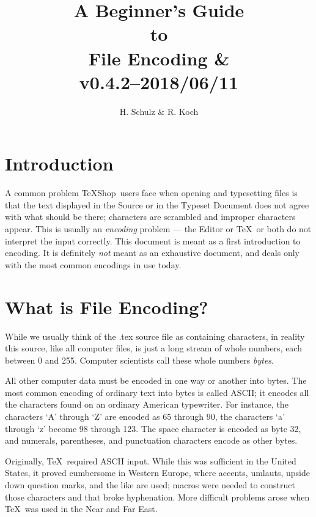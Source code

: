 \documentclass[letterpaper,11pt]{article}
\title{A Beginner's Guide\\to\\File Encoding \& \TS\\\small v0.4.2--2018/06/11}
\author{H. Schulz \& R. Koch}
\date{}
\newcommand{\TS}{\textsf{\TeX Shop}}
\newcommand{\acr}[1]{\textsf{#1}}
\newcommand{\cmd}[1]{\textsf{#1}}
\begin{document}
\maketitle


\section{Introduction}
A common problem \TS\ users face when opening and typesetting files is that the text displayed in the Source or in the Typeset Document does not agree with what should be there; characters are scrambled and  improper characters appear. This is usually an \emph{encoding} problem ---  the Editor or \TeX\ or both do not interpret the input correctly. This document is meant as a first introduction to encoding. It is definitely \emph{not} meant as an exhaustive document, and deals only with the most common encodings in use today.

\section{What is File Encoding?}
While we usually think of the \cmd{.tex} source file as containing characters, in reality this source, like all computer files, is just a long stream of whole numbers, each between 0 and 255. 
Computer scientists call these whole numbers {\em bytes}. 

All other computer data must be encoded in one way or another into bytes. The most common encoding of ordinary text into bytes is called \acr{ASCII}; it encodes all the characters found on an ordinary American typewriter. For instance, the characters `A' through `Z' are encoded as 65 through 90,  the characters `a' through `z' become 98 through 123. The space character is encoded as byte 32, and numerals, parentheses, and punctuation characters encode as other bytes.

Originally, \TeX\ required \acr{ASCII} input. While this was sufficient in the United States, it proved cumbersome in Western Europe, where accents, umlauts, upside down question marks, and the like are used; macros were needed to construct those characters and that broke hyphenation. More difficult problems arose when \TeX\ was used in the Near and Far East.
\end{document}
